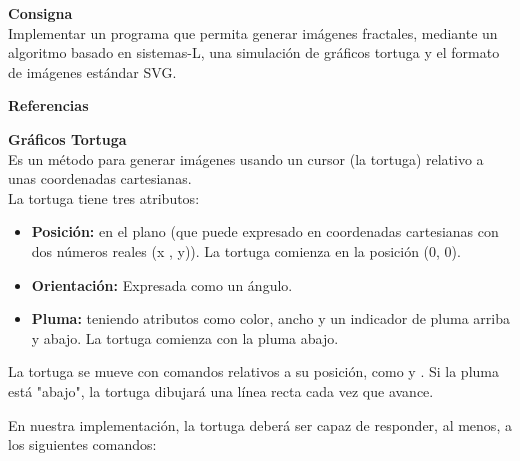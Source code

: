 \documentclass{article}
\begin{document}
\begin{description}
	\item \textbf{Consigna} \\ Implementar un programa que permita generar im\'agenes fractales, mediante un algoritmo basado en sistemas-L, una simulaci\'on de gr\'aficos tortuga y el formato de im\'agenes est\'andar SVG. \\[0.2cm]

\begin{huge}
	\begin{center}
		\textbf{Referencias \\[0.5cm]}
	\end{center}	 
\end{huge}

	 \item \textbf{Gr\'aficos Tortuga} \\[0.2cm] 
		Es un m\'etodo para generar im\'agenes usando un cursor (la tortuga) relativo a unas coordenadas cartesianas. \\ 	
		
		La tortuga tiene tres atributos: 
			\begin{itemize}
				\item \textbf{Posici\'on:} en el plano (que puede expresado en coordenadas cartesianas con dos n\'umeros reales (x , y)). La tortuga comienza en la posición (0, 0).  \\
				\item \textbf{Orientaci\'on:} Expresada como un \'angulo. \\
				\item \textbf{Pluma:} teniendo atributos como color, ancho y un indicador de pluma arriba y abajo. La tortuga comienza con la pluma abajo.\\
			\end{itemize}
		
		La tortuga se mueve con comandos relativos a su posici\'on, como  y . Si la pluma est\'a "abajo", la tortuga dibujar\'a una línea recta cada vez que avance.
		
		\item En nuestra implementaci\'on, la tortuga deber\'a ser capaz de responder, al menos, a los siguientes comandos:
		

\end{description}
\end{document}
